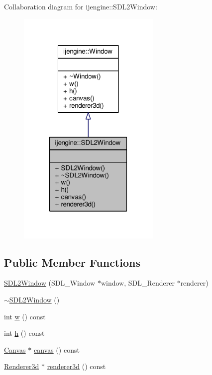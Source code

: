 Collaboration diagram for ijengine\-:\-:S\-D\-L2\-Window\-:\nopagebreak
\begin{figure}[H]
\begin{center}
\leavevmode
\includegraphics[width=194pt]{classijengine_1_1SDL2Window__coll__graph}
\end{center}
\end{figure}
\subsection*{Public Member Functions}
\begin{DoxyCompactItemize}
\item 
\hyperlink{classijengine_1_1SDL2Window_ae49b726543bf75c4ef88577873c0b595}{S\-D\-L2\-Window} (S\-D\-L\-\_\-\-Window $\ast$window, S\-D\-L\-\_\-\-Renderer $\ast$renderer)
\item 
\hyperlink{classijengine_1_1SDL2Window_adacbfc303f24217bbcffeadfe0196a16}{$\sim$\-S\-D\-L2\-Window} ()
\item 
int \hyperlink{classijengine_1_1SDL2Window_a9ee858781f682de6e1f4e07e0e005d52}{w} () const 
\item 
int \hyperlink{classijengine_1_1SDL2Window_a22bfc90a19791ec62bee093b573a1317}{h} () const 
\item 
\hyperlink{classijengine_1_1Canvas}{Canvas} $\ast$ \hyperlink{classijengine_1_1SDL2Window_a67813fe0b83700d046a4b84112b9ceb3}{canvas} () const 
\item 
\hyperlink{classijengine_1_1Renderer3d}{Renderer3d} $\ast$ \hyperlink{classijengine_1_1SDL2Window_aa35b142bef03f2fd5fc17382bfef39f1}{renderer3d} () const 
\end{DoxyCompactItemize}


